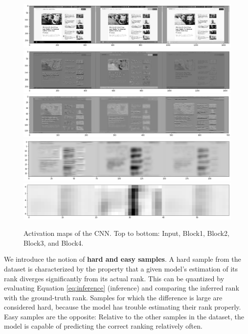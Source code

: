 \begin{figure}
    \centering
    \includegraphics[clip,width=\columnwidth]{resources/analysis/feat-map-0.png}\\
    \includegraphics[clip,width=\columnwidth]{resources/analysis/feat-map-1.png}\\
    \includegraphics[clip,width=\columnwidth]{resources/analysis/feat-map-2.png}\\
    \includegraphics[clip,width=\columnwidth]{resources/analysis/feat-map-3.png}\\
    \includegraphics[clip,width=\columnwidth]{resources/analysis/feat-map-4.png}\\
    \caption[Activation maps of the CNN]{Activation maps of the CNN. Top to bottom: Input, Block1, Block2, Block3, and Block4.}
    \label{fig:activationmaps}
\end{figure}

We introduce the notion of \textbf{hard and easy samples}. A hard sample from the dataset is characterized by the property that a given model's estimation of its rank diverges significantly from its actual rank. This can be quantized by evaluating Equation \ref{eq:inference} (inference) and comparing the inferred rank with the ground-truth rank. Samples for which the difference is large are considered hard, because the model has trouble estimating their rank properly. Easy samples are the opposite: Relative to the other samples in the dataset, the model is capable of predicting the correct ranking relatively often.

